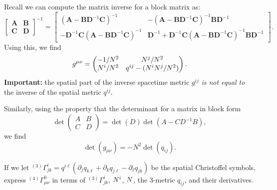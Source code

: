 Recall we can compute the matrix inverse for a block matrix as:
\begin{equation}
  \begin{bmatrix}
    \mathbf{A} & \mathbf{B} \\
    \mathbf{C} & \mathbf{D}
   \end{bmatrix}^{-1} 
    = \begin{bmatrix}
     \left(\mathbf{A} - \mathbf{BD}^{-1}\mathbf{C}\right)^{-1} &
    -\left(\mathbf{A} - \mathbf{BD}^{-1}\mathbf{C}\right)^{-1}\mathbf{BD}^{-1} \\
    -\mathbf{D}^{-1}\mathbf{C}\left(\mathbf{A} - \mathbf{BD}^{-1}\mathbf{C}\right)^{-1} &
    \mathbf{D}^{-1} + \mathbf{D}^{-1}\mathbf{C}\left(\mathbf{A} - \mathbf{BD}^{-1}\mathbf{C}\right)^{-1}\mathbf{BD}^{-1}
  \end{bmatrix}.
\end{equation}
Using this, we find
\begin{equation}
  g^{\mu\nu}
  = \begin{pmatrix} -1/N^{2} & N^{j}/N^{2}\\
    N^{i}/N^{2} & q^{ij} - (N^{i}N^{j}/N^{2})
  \end{pmatrix}.
\end{equation}
\textbf{Important:} the spatial part of the inverse spacetime metric
$g^{ij}$ \emph{is not equal to} the inverse of the spatial metric $q^{ij}$.

Similarly, using the property that the determinant for a matrix in block
form
\begin{equation}
\det\begin{pmatrix}A & B\\ C & D
\end{pmatrix} = \det(D)\det(A - CD^{-1}B),
\end{equation}
we find
\begin{equation}\label{eq:cauchy-surface:determinant-of-metric}
\det(g_{\mu\nu}) = -N^{2}\det(q_{ij}).
\end{equation}

\begin{exercise}
If we let ${}^{(3)}\Gamma^{i}_{jk} = q^{i\ell}(\partial_{j}q_{k\ell}+\partial_{k}q_{j\ell}-\partial_{\ell}q_{jk})$
be the spatial Christoffel symbols, express
${}^{(4)}\Gamma^{0}_{\mu\nu}$ in terms of ${}^{(3)}\Gamma^{i}_{jk}$,
$N^{i}$, $N$, the 3-metric $q_{ij}$, and their derivatives.
\end{exercise}

